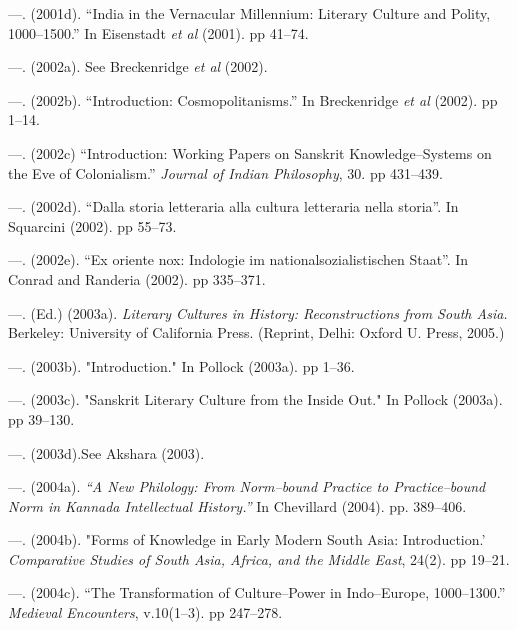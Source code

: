 \begin{thebibliography}{99}
 \item —. (2001d). “India in the Vernacular Millennium: Literary Culture and Polity, 1000–1500.” In Eisenstadt \textit{et al} (2001). pp 41–74.

 \item —. (2002a). See Breckenridge \textit{et al} (2002).

 \item —. (2002b). “Introduction: Cosmopolitanisms.” In Breckenridge \textit{et al} (2002). pp 1–14.

 \item —. (2002c) “Introduction: Working Papers on Sanskrit Knowledge–Systems on the Eve of Colonialism.” \textit{Journal of Indian Philosophy}, 30. pp 431–439.

 \item —. (2002d). “Dalla storia letteraria alla cultura letteraria nella storia”. In Squarcini (2002). pp 55–73.

 \item —. (2002e). “Ex oriente nox: Indologie im nationalsozialistischen Staat”. In Conrad and Randeria (2002). pp 335–371.

 \item —. (Ed.) (2003a). \textit{Literary Cultures in History: Reconstructions from South Asia. }Berkeley: University of California Press. (Reprint, Delhi: Oxford U. Press, 2005.)

 \item —. (2003b). "Introduction." In Pollock (2003a). pp 1–36.

 \item —. (2003c). "Sanskrit Literary Culture from the Inside Out." In Pollock (2003a). pp 39–130.

 \item —. (2003d).See Akshara (2003).

 \item —. (2004a).\textit{ “A New Philology: From Norm–bound Practice to Practice–bound Norm in Kannada Intellectual History.” }In Chevillard (2004). pp. 389–406.

 \item —. (2004b). "Forms of Knowledge in Early Modern South Asia: Introduction.’ \textit{Comparative Studies of South Asia, Africa, and the Middle East}, 24(2). pp 19–21.

 \item —. (2004c). “The Transformation of Culture–Power in Indo–Europe, 1000–1300.” \textit{Medieval Encounters}, v.10(1–3). pp 247–278.


\end{thebibliography}
